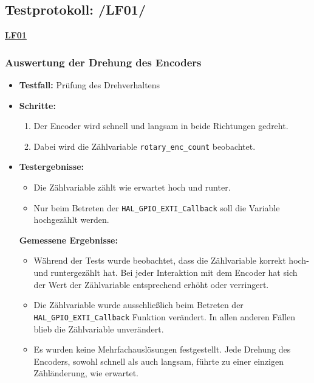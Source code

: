 \subsection{Testprotokoll: /LF01/}
\textbf{\hyperlink{LF01_Link}{LF01}} \\

\subsubsection{Auswertung der Drehung des Encoders}
\begin{itemize}
	\item \textbf{Testfall:} Prüfung des Drehverhaltens
	\item \textbf{Schritte:}
	\begin{enumerate}
		\item Der Encoder wird schnell und langsam in beide Richtungen gedreht.
		\item Dabei wird die Zählvariable \texttt{rotary\_enc\_count} beobachtet.
	\end{enumerate}
\item \textbf{Testergebnisse:}
\begin{itemize}
	\item Die Zählvariable zählt wie erwartet hoch und runter.
	\item Nur beim Betreten der \texttt{HAL\_GPIO\_EXTI\_Callback} soll die Variable hochgezählt werden.
\end{itemize}

\textbf{Gemessene Ergebnisse:}
\begin{itemize}
	\item Während der Tests wurde beobachtet, dass die Zählvariable korrekt hoch- und runtergezählt hat. Bei jeder Interaktion mit dem Encoder hat sich der Wert der Zählvariable entsprechend erhöht oder verringert.
	\item Die Zählvariable wurde ausschließlich beim Betreten der \texttt{HAL\_GPIO\_EXTI\_Callback} Funktion verändert. In allen anderen Fällen blieb die Zählvariable unverändert.
\end{itemize}

\begin{itemize}
	\item Es wurden keine Mehrfachauslösungen festgestellt. Jede Drehung des Encoders, sowohl schnell als auch langsam, führte zu einer einzigen Zähländerung, wie erwartet.
\end{itemize}

\end{itemize}




